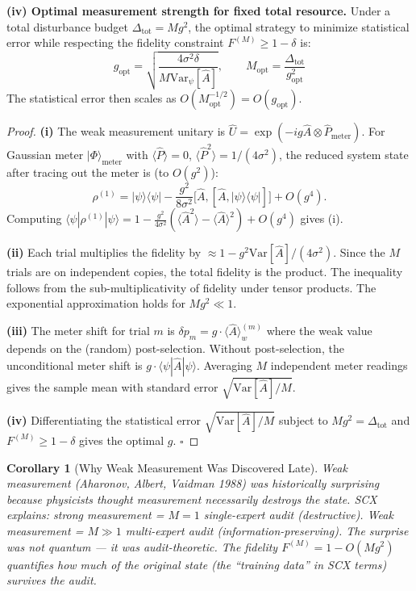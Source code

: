 \documentclass[11pt,a4paper]{article}
\newcommand{\bra}[1]{\langle #1|}
\newcommand{\ket}[1]{|#1\rangle}
\newcommand{\braket}[1]{\langle #1 \rangle}
\newtheorem{corollary}[theorem]{Corollary}
\theoremstyle{definition}
\theoremstyle{remark}
\newcommand{\brak}[1]{\langle #1 \rangle}
\newcommand{\Var}{\mathrm{Var}}
\begin{document}
\noindent\textbf{(iv) Optimal measurement strength for fixed total resource.}
Under a total disturbance budget $\Delta_{\text{tot}} = M g^2$, the optimal strategy to minimize statistical error while respecting the fidelity constraint $F^{(M)} \geq 1 - \delta$ is:
\[
g_{\text{opt}} = \sqrt{\frac{4\sigma^2 \delta}{M \Var_{\psi}[\hat{A}]}}, \qquad M_{\text{opt}} = \frac{\Delta_{\text{tot}}}{g_{\text{opt}}^2}
\]
The statistical error then scales as $O(M_{\text{opt}}^{-1/2}) = O(g_{\text{opt}})$.

\begin{proof}
\textbf{(i)} The weak measurement unitary is $\hat{U} = \exp(-i g \hat{A} \otimes \hat{P}_{\text{meter}})$. For Gaussian meter $\ket{\Phi}_{\text{meter}}$ with $\braket{\hat{P}} = 0$, $\braket{\hat{P}^2} = 1/(4\sigma^2)$, the reduced system state after tracing out the meter is (to $O(g^2)$):
\[
\rho^{(1)} = \ket{\psi}\bra{\psi} - \frac{g^2}{8\sigma^2}\bigl[\hat{A}, [\hat{A}, \ket{\psi}\bra{\psi}]\bigr] + O(g^4).
\]
Computing $\braket{\psi|\rho^{(1)}|\psi} = 1 - \frac{g^2}{4\sigma^2}(\braket{\hat{A}^2} - \braket{\hat{A}}^2) + O(g^4)$ gives (i).

\textbf{(ii)} Each trial multiplies the fidelity by $\approx 1 - g^2 \Var[\hat{A}]/(4\sigma^2)$. Since the $M$ trials are on independent copies, the total fidelity is the product. The inequality follows from the sub-multiplicativity of fidelity under tensor products. The exponential approximation holds for $M g^2 \ll 1$.

\textbf{(iii)} The meter shift for trial $m$ is $\delta p_m = g \cdot \brak{\hat{A}}_w^{(m)}$ where the weak value depends on the (random) post-selection. Without post-selection, the unconditional meter shift is $g \cdot \braket{\psi|\hat{A}|\psi}$. Averaging $M$ independent meter readings gives the sample mean with standard error $\sqrt{\Var[\hat{A}]/M}$.

\textbf{(iv)} Differentiating the statistical error $\sqrt{\Var[\hat{A}]/M}$ subject to $M g^2 = \Delta_{\text{tot}}$ and $F^{(M)} \geq 1 - \delta$ gives the optimal $g$. $\square$
\end{proof}

\begin{corollary}[Why Weak Measurement Was Discovered Late]
Weak measurement (Aharonov, Albert, Vaidman 1988) was historically surprising because physicists thought measurement necessarily destroys the state. SCX explains: strong measurement = $M=1$ single-expert audit (destructive). Weak measurement = $M \gg 1$ multi-expert audit (information-preserving). The surprise was not quantum --- it was audit-theoretic. The fidelity $F^{(M)} = 1 - O(M g^2)$ quantifies \emph{how much of the original state (the ``training data'' in SCX terms) survives the audit}.
\end{corollary}
\end{document}
